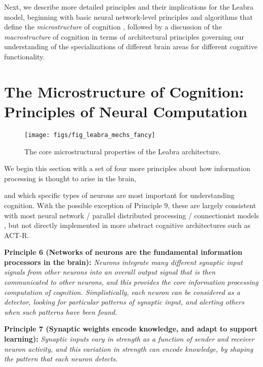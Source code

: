 \documentclass[11pt,twoside]{article}
\begin{document}
Next, we describe more detailed principles and their implications for
the Leabra model, beginning with basic neural network-level principles
and algorithms that define the {\em microstructure} of cognition
\cite[c.f.,]{RumelhartMcClelland86,McClellandRumelhart86}, followed by
a discussion of the {\em macrostructure} of cognition in terms of
architectural principles governing our understanding of the
specializations of different brain areas for different cognitive
functionality.

\section{The Microstructure of Cognition: Principles of Neural Computation}

\begin{figure}
  \centering\texttt{[image: figs/fig\_leabra\_mechs\_fancy]}
  \caption{\small The core microstructural properties of the Leabra architecture.}
  \label{fig.leabra_mechs}
\end{figure}

We begin this section with a set of four more principles about how
information processing is thought to arise in the brain,

and which specific types of neurons are most important for
understanding cognition. With the possible exception of Principle 9,
these are largely consistent with most neural network / parallel
distributed processing / connectionist models
\cite{RumelhartMcClelland86,McClellandRumelhart86,McClellandRumelhart88,JayGRAIN,etc},
but not directly implemented in more abstract cognitive architectures
such as ACT-R.

{\bf Principle 6 (Networks of neurons are the fundamental information
  processors in the brain):} {\em Neurons integrate many different
  synaptic input signals from other neurons into an overall output
  signal that is then communicated to other neurons, and this provides
  the core information processing computation of cognition.
  Simplistically, each neuron can be considered as a detector, looking
  for particular patterns of synaptic input, and alerting others when
  such patterns have been found.}

{\bf Principle 7 (Synaptic weights encode knowledge, and adapt to
  support learning):} {\em Synaptic inputs vary in strength as a
  function of sender and receiver neuron activity, and this variation
  in strength can encode knowledge, by shaping the pattern that each
  neuron detects.}
\end{document}
